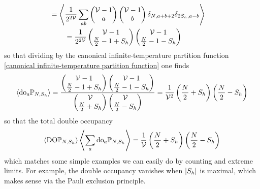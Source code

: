 \begin{align}
    \nonumber\\
    =\Bigg\langle & \frac{1}{2^{2\mathcal{V}}} \sum_{ab} \begin{pmatrix} \mathcal{V}-1 \\ a \end{pmatrix} \begin{pmatrix} \mathcal{V}-1 \\ b \end{pmatrix} \delta_{N,a+b+2} \delta_{2S_h,a-b} \Bigg\rangle
    \nonumber\\
    &= \frac{1}{2^{2\mathcal{V}}} \begin{pmatrix} \mathcal{V}-1 \\ \frac{N}{2}-1+S_h \end{pmatrix} \begin{pmatrix} \mathcal{V}-1 \\ \frac{N}{2}-1-S_h \end{pmatrix}
\end{align}
so that dividing by the canonical infinite-temperature partition function \eqref{canonical infinite-temperature partition function} one finds
\begin{align}
    \left\langle \textrm{do}_a \mathbb{P}_{N,S_h} \right\rangle
    =
    \frac{
        \begin{pmatrix} \mathcal{V}-1 \\ \frac{N}{2}-1+S_h \end{pmatrix} \begin{pmatrix} \mathcal{V}-1 \\ \frac{N}{2}-1-S_h \end{pmatrix}
    }{  \begin{pmatrix} \mathcal{V} \\ \frac{N}{2} + S_h \end{pmatrix} \begin{pmatrix} \mathcal{V} \\ \frac{N}{2}-S_h \end{pmatrix}}
    =
    \frac{1}{\mathcal{V}^2}\left(\frac{N}{2}+S_h\right)\left(\frac{N}{2}-S_h\right)
\end{align}
so that the total double occupancy 
\begin{align}
    \left\langle \textrm{DO} \mathbb{P}_{N,S_h} \right\rangle
    \left\langle \sum_a \textrm{do}_a\mathbb{P}_{N,S_h} \right\rangle
    =
    \frac{1}{\mathcal{V}}\left(\frac{N}{2}+S_h\right)\left(\frac{N}{2}-S_h\right)
    \label{eq:infinite temperature Double Occupancy}
\end{align}
which matches some simple examples we can easily do by counting and extreme limits.
For example, the double occupancy vanishes when $\left| S_h \right|$ is maximal, which makes sense via the Pauli exclusion principle.
